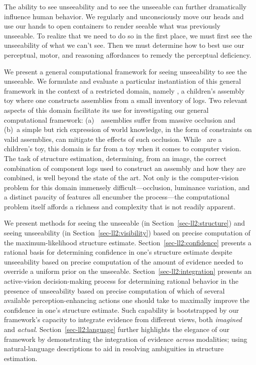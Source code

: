 The ability to see unseeability and to see the unseeable can further
dramatically influence human behavior.
%
We regularly and unconsciously move our heads and use our hands to open
containers to render seeable what was previously unseeable.
%
To realize that we need to do so in the first place, we must first see the
unseeability of what we can't see.
%
Then we must determine how to best use our perceptual, motor, and reasoning
affordances to remedy the perceptual deficiency.

We present a general computational framework for seeing unseeability to see the
unseeable.
%
We formulate and evaluate a particular instantiation of this general framework
in the context of a restricted domain, namely \LincolnLogs, a children's
assembly toy where one constructs assemblies from a small inventory of logs.
%
Two relevant aspects of this domain facilitate its use for investigating our
general computational framework: (a)~\LincolnLog\ assemblies suffer from
massive occlusion and (b)~a simple but rich expression of world knowledge, in
the form of constraints on valid assemblies, can mitigate the effects of such
occlusion.
%
While \LincolnLogs\ are a children's toy, this domain is far from a toy when it
comes to computer vision.
%
The task of structure estimation, determining, from an image, the correct
combination of component logs used to construct an assembly and how they are
combined, is well beyond the state of the art.
%
Not only is the computer-vision problem for this domain immensely
difficult---occlusion, luminance variation, and a distinct paucity of features
all encumber the process---the computational problem itself affords a richness
and complexity that is not readily apparent.

We present methods for seeing the unseeable (in Section~\ref{sec-ll2:structure})
and seeing unseeability (in Section~\ref{sec-ll2:visibility}) based on precise
computation of the maximum-likelihood structure estimate.
%
Section~\ref{sec-ll2:confidence} presents a rational basis for determining
confidence in one's structure estimate despite unseeability based on precise
computation of the amount of evidence needed to override a uniform prior on the
unseeable.
%
Section~\ref{sec-ll2:integration} presents an active-vision decision-making
process for determining rational behavior in the presence of unseeability based
on precise computation of which of several available perception-enhancing
actions one should take to maximally improve the confidence in one's structure
estimate.
%
Such capability is bootstrapped by our framework's capacity to integrate
evidence from different views, both \emph{imagined} and \emph{actual}.
%
Section~\ref{sec-ll2:language} further highlights the elegance of our framework by
demonstrating the integration of evidence \emph{across} modalities; using
natural-language descriptions to aid in resolving ambiguities in structure
estimation.


